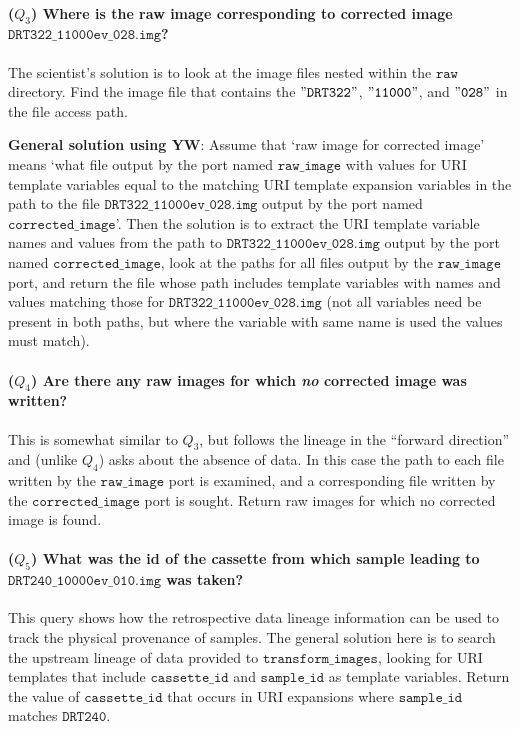 \documentclass[letterpaper,twocolumn,10pt]{article}
\newcommand{\code}[1]{\ensuremath{\mathtt{#1}}}
\newcommand{\yw}{\textsf{YW}}
\begin{document}
\paragraph{($Q_3$)
  Where is the raw image corresponding to corrected image
  \code{DRT322\_11000ev\_028.img}?}
The scientist's solution is to look at the image files nested within
the \code{raw} directory.  Find the image file that contains the
\code{"DRT322"}, \code{"11000"}, and \code{"028"} in the file access
path.

\textbf{General solution using \yw}: Assume that `raw image for
corrected image' means `what file output by the port named
\code{raw\_image} with values for URI template variables equal to the
matching URI template expansion variables in the path to the file
\code{DRT322\_11000ev\_028.img} output by the port named
\code{corrected\_image}'.  Then the solution is to extract the URI
template variable names and values from the path to
\code{DRT322\_11000ev\_028.img} output by the port named
\code{corrected\_image}, look at the paths for all files output by the
\code{raw\_image} port, and return the file whose path includes
template variables with names and values matching those for
\code{DRT322\_11000ev\_028.img} (not all variables need be present in
both paths, but where the variable with same name is used the values
must match).

\paragraph{($Q_4$)
  Are there any raw images for which \emph{no} corrected image was written?}
This is somewhat similar to $Q_ 3$, but follows the lineage in the
``forward direction'' and (unlike $Q_4$) asks about the absence of
data.  In this case the path to each file written by the
\code{raw\_image} port is examined, and a corresponding file written
by the \code{corrected\_image} port is sought.  Return raw images for
which no corrected image is found.

\paragraph{($Q_5$) What was the id of the cassette from which sample
  leading to \code{DRT240\_10000ev\_010.img} was taken?} This query
shows how the retrospective data lineage information can be used to
track the physical provenance of samples.  The general solution here
is to search the upstream lineage of data provided to
\code{transform\_images}, looking for URI templates that include
\code{cassette\_id} and \code{sample\_id} as template
variables. Return the value of \code{cassette\_id} that occurs in URI
expansions where \code{sample\_id} matches \code{DRT240}.
\end{document}
